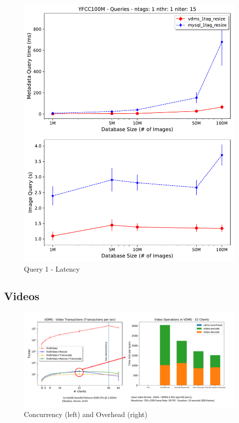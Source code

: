 \begin{figure}[]
\centering
\includegraphics[width=\columnwidth]{figures/q1_latency}
\caption{Query 1 - Latency}
\label{fig:q1_latency}
\end{figure}

\subsection{Videos}

\begin{figure}[ht!]
\centering
\includegraphics[width=\textwidth]{figures/video_overhead}
\caption{Concurrency (left) and Overhead (right)}
\label{fig:video}
\end{figure}

